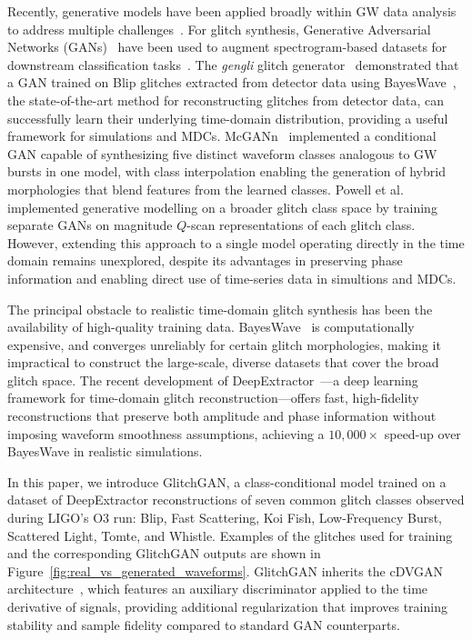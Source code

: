 \documentclass[reprint,nofootinbib,amsmath,amssymb,aps,floatfix]{revtex4-2}
\begin{document}
Recently, generative models have been applied broadly within GW data analysis to address multiple challenges~\cite{Liao:2021vec, PhysRevD.110.104055}.
For glitch synthesis, Generative Adversarial Networks (GANs)~\cite{Goodfellow:2014upx} have been used to augment spectrogram-based datasets for downstream classification tasks~\cite{GAN_spec_best, Jade_Powell_paper}.
The \textit{gengli} glitch generator~\cite{GENGLI, GENGLI_2} demonstrated that a GAN trained on Blip glitches extracted from detector data using BayesWave~\cite{BayesWave}, the state-of-the-art method for reconstructing glitches from detector data, can successfully learn their underlying time-domain distribution, providing a useful framework for simulations and MDCs.
McGANn~\cite{McGinn_2021} implemented a conditional GAN capable of synthesizing five distinct waveform classes analogous to GW bursts in one model, with class interpolation enabling the generation of hybrid morphologies that blend features from the learned classes.
Powell et al.~\cite{Jade_Powell_paper} implemented generative modelling on a broader glitch class space by training separate GANs on magnitude $Q$-scan representations of each glitch class.
However, extending this approach to a single model operating directly in the time domain remains unexplored, despite its advantages in preserving phase information and enabling direct use of time-series data in simultions and MDCs.

The principal obstacle to realistic time-domain glitch synthesis has been the availability of high-quality training data.
BayesWave~\cite{BayesWave} is computationally expensive, and converges unreliably for certain glitch morphologies, making it impractical to construct the large-scale, diverse datasets that cover the broad glitch space.
The recent development of DeepExtractor~\cite{DeepExtractor_paper}---a deep learning framework for time-domain glitch reconstruction---offers fast, high-fidelity reconstructions that preserve both amplitude and phase information without imposing waveform smoothness assumptions, achieving a $10{,}000\times$ speed-up over BayesWave in realistic simulations.

In this paper, we introduce GlitchGAN, a class-conditional model trained on a dataset of DeepExtractor reconstructions of seven common glitch classes observed during LIGO's O3 run: Blip, Fast Scattering, Koi Fish, Low-Frequency Burst, Scattered Light, Tomte, and Whistle.
Examples of the glitches used for training and the corresponding GlitchGAN outputs are shown in Figure~\ref{fig:real_vs_generated_waveforms}.
GlitchGAN inherits the cDVGAN architecture~\cite{cdvgan, dooney2022dvgan}, which features an auxiliary discriminator applied to the time derivative of signals, providing additional regularization that improves training stability and sample fidelity compared to standard GAN counterparts.
\end{document}
